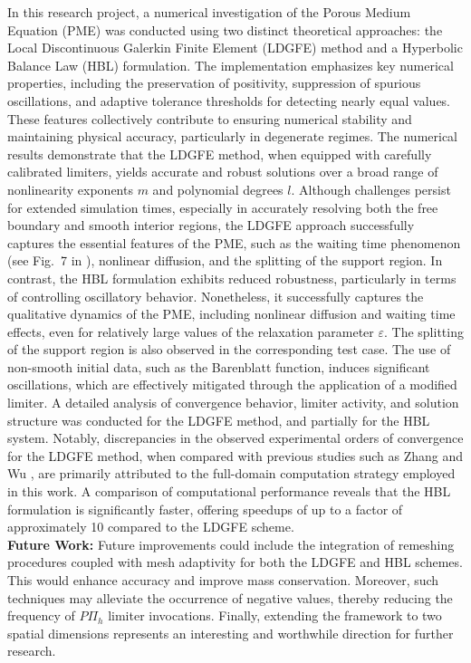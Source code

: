 \documentclass[a4paper,12pt]{paper}
\begin{document}
In this research project, a numerical investigation of the Porous Medium Equation (PME) was conducted using two distinct theoretical approaches: the Local Discontinuous Galerkin Finite Element (LDGFE) method and a Hyperbolic Balance Law (HBL) formulation. The implementation emphasizes key numerical properties, including the preservation of positivity, suppression of spurious oscillations, and adaptive tolerance thresholds for detecting nearly equal values. These features collectively contribute to ensuring numerical stability and maintaining physical accuracy, particularly in degenerate regimes.
The numerical results demonstrate that the LDGFE method, when equipped with carefully calibrated limiters, yields accurate and robust solutions over a broad range of nonlinearity exponents $m$ and polynomial degrees $l$. Although challenges persist for extended simulation times, especially in accurately resolving both the free boundary and smooth interior regions, the LDGFE approach successfully captures the essential features of the PME, such as the waiting time phenomenon (see Fig.~7 in \cite{Zhang2009}), nonlinear diffusion, and the splitting of the support region.
In contrast, the HBL formulation exhibits reduced robustness, particularly in terms of controlling oscillatory behavior. Nonetheless, it successfully captures the qualitative dynamics of the PME, including nonlinear diffusion and waiting time effects, even for relatively large values of the relaxation parameter $\varepsilon$. The splitting of the support region is also observed in the corresponding test case. The use of non-smooth initial data, such as the Barenblatt function, induces significant oscillations, which are effectively mitigated through the application of a modified limiter.
A detailed analysis of convergence behavior, limiter activity, and solution structure was conducted for the LDGFE method, and partially for the HBL system. Notably, discrepancies in the observed experimental orders of convergence for the LDGFE method, when compared with previous studies such as Zhang and Wu \cite{Zhang2009}, are primarily attributed to the full-domain computation strategy employed in this work.
A comparison of computational performance reveals that the HBL formulation is significantly faster, offering speedups of up to a factor of approximately 10 compared to the LDGFE scheme.\\
\noindent \textbf{Future Work:} Future improvements could include the integration of remeshing procedures coupled with mesh adaptivity for both the LDGFE and HBL schemes. This would enhance accuracy and improve mass conservation. Moreover, such techniques may alleviate the occurrence of negative values, thereby reducing the frequency of $P\Pi_h$ limiter invocations. Finally, extending the framework to two spatial dimensions represents an interesting and worthwhile direction for further research.
\end{document}

